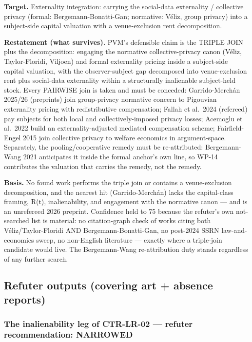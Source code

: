 \documentclass[
  11pt,
]{article}
\begin{document}
\textbf{Target.} Externality integration: carrying the social-data
externality / collective privacy (formal: Bergemann-Bonatti-Gan;
normative: Véliz, group privacy) into a subject-side capital valuation
with a venue-exclusion rent decomposition.

\textbf{Restatement (what survives).} PVM's defensible claim is the
TRIPLE JOIN plus the decomposition: engaging the normative
collective-privacy canon (Véliz, Taylor-Floridi, Viljoen) and formal
externality pricing inside a subject-side capital valuation, with the
observer-subject gap decomposed into venue-exclusion rent plus
social-data externality within a structurally inalienable subject-held
stock. Every PAIRWISE join is taken and must be conceded:
Garrido-Merchán 2025/26 (preprints) join group-privacy normative concern
to Pigouvian externality pricing with redistributive compensation;
Fallah et al.~2024 (refereed) pay subjects for both local and
collectively-imposed privacy losses; Acemoglu et al.~2022 build an
externality-adjusted mediated compensation scheme; Fairfield-Engel 2015
join collective privacy to welfare economics in argument-space.
Separately, the pooling/cooperative remedy must be re-attributed:
Bergemann-Wang 2021 anticipates it inside the formal anchor's own line,
so WP-14 contributes the valuation that carries the remedy, not the
remedy.

\textbf{Basis.} No found work performs the triple join or contains a
venue-exclusion decomposition, and the nearest hit (Garrido-Merchán)
lacks the capital-class framing, R(t), inalienability, and engagement
with the normative canon --- and is an unrefereed 2026 preprint.
Confidence held to 75 because the refuter's own not-searched list is
material: no citation-graph check of works citing both
Véliz/Taylor-Floridi AND Bergemann-Bonatti-Gan, no post-2024 SSRN
law-and-economics sweep, no non-English literature --- exactly where a
triple-join candidate would live. The Bergemann-Wang re-attribution duty
stands regardless of any further search.

\subsection{Refuter outputs (covering art + absence
reports)}\label{refuter-outputs-covering-art-absence-reports}

\subsubsection{The inalienability leg of CTR-LR-02 --- refuter
recommendation:
NARROWED}\label{the-inalienability-leg-of-ctr-lr-02-refuter-recommendation-narrowed}
\end{document}
